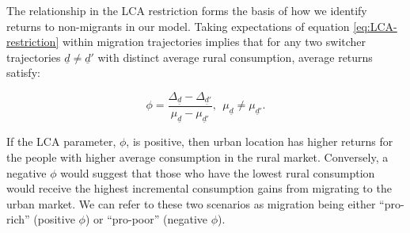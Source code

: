 \documentclass[12pt]{article}
\begin{document}
The relationship in the LCA restriction forms the basis of how we identify returns to non-migrants in our model.
Taking expectations of equation \eqref{eq:LCA-restriction} within migration trajectories implies that for any two switcher trajectories $\underline{d} \neq \underline{d}'$ with distinct average rural consumption, average returns satisfy:

\begin{equation}
    \phi = \frac{\Delta_{\underline{d}} - \Delta_{\underline{d}'}}{\mu_{\underline{d}} - \mu_{\underline{d}'}},\ \ \mu_{\underline{d}} \neq \mu_{\underline{d}'}.\label{eq:phi-proposition1}
\end{equation}

If the LCA parameter, $\phi$, is positive, then urban location has higher returns for the people with higher average consumption in the rural market.
Conversely, a negative $\phi$ would suggest that those who have the lowest rural consumption would receive the highest incremental consumption gains from migrating to the urban market.
We can refer to these two scenarios as migration being either ``pro-rich'' (positive $\phi$) or ``pro-poor'' (negative $\phi$).
 


\end{document}
